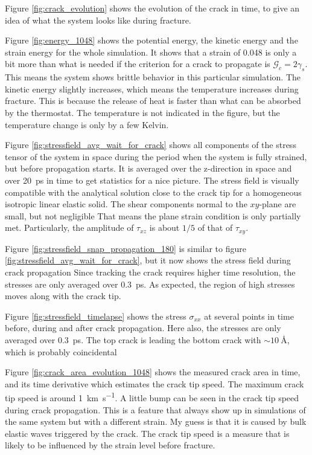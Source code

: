Figure \ref{fig:crack_evolution} shows the evolution of the crack in time, to give an idea of what the system looks like during fracture. 

Figure \ref{fig:energy_1048} shows the potential energy, the kinetic energy and the strain energy for the whole simulation. It shows that a strain of 0.048 is only a bit more than what is needed if the criterion for a crack to propagate is $\mathcal{G}_c = 2\gamma_s$. This means the system shows brittle behavior in this particular simulation. The kinetic energy slightly increases, which means the temperature increases during fracture. This is because the release of heat is faster than what can be absorbed by the thermostat. The temperature is not indicated in the figure, but the temperature change is only by a few Kelvin. 

Figure \ref{fig:stressfield_avg_wait_for_crack} shows all components of the stress tensor of the system in space during the period when the system is fully strained, but before propagation starts. It is averaged over the z-direction in space and over \SI{20}{\pico\second} in time to get statistics for a nice picture. The stress field is visually compatible with the analytical solution close to the crack tip for a homogeneous isotropic linear elastic solid. The shear components normal to the $xy$-plane are small, but not negligible That means the plane strain condition is only partially met. Particularly, the amplitude of $\tau_{xz}$ is about $1/5$ of that of $\tau_{xy}$. 


Figure \ref{fig:stressfield_snap_propagation_180} is similar to figure \ref{fig:stressfield_avg_wait_for_crack}, but it now shows the stress field during crack propagation Since tracking the crack requires higher time resolution, the stresses are only averaged over \SI{0.3}{\pico\second}. As expected, the region of high stresses moves along with the crack tip.

Figure \ref{fig:stressfield_timelapse} shows the stress $\sigma_{xx}$ at several points in time before, during and after crack propagation. Here also, the stresses are only averaged over \SI{0.3}{\pico\second}. The top crack is leading the bottom crack with $\sim \SI{10}{\angstrom}$, which is probably coincidental

Figure \ref{fig:crack_area_evolution_1048} shows the measured crack area in time, and its time derivative which estimates the crack tip speed. The maximum crack tip speed is around \SI{1}{\kilo\meter\per\second}. A little bump can be seen in the crack tip speed during crack propagation. This is a feature that always show up in simulations of the same system but with a different strain. My guess is that it is caused by bulk elastic waves triggered by the crack. The crack tip speed is a measure that is likely to be influenced by the strain level before fracture. 

